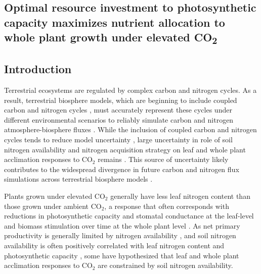 \begin{singlespace}
    \chapter{\textbf{Optimal resource investment to photosynthetic capacity maximizes nutrient allocation to whole plant growth under elevated CO\textsubscript{2}}}
\end{singlespace}
    
\section{Introduction}
\noindent Terrestrial ecosystems are regulated by complex carbon and nitrogen cycles. As a result, terrestrial biosphere models, which are beginning to include coupled carbon and nitrogen cycles , must accurately represent these cycles under different environmental scenarios to reliably simulate carbon and nitrogen atmosphere-biosphere fluxes . While the inclusion of coupled carbon and nitrogen cycles tends to reduce model uncertainty , large uncertainty in role of soil nitrogen availability and nitrogen acquisition strategy on leaf and whole plant acclimation responses to CO$_2$ remains . This source of uncertainty likely contributes to the widespread divergence in future carbon and nitrogen flux simulations across terrestrial biosphere models .

Plants grown under elevated CO$_2$ generally have less leaf nitrogen content than those grown under ambient CO$_2$, a response that often corresponds with reductions in photosynthetic capacity and stomatal conductance at the leaf-level and biomass stimulation over time at the whole plant level . As net primary productivity is generally limited by nitrogen availability , and soil nitrogen availability is often positively correlated with leaf nitrogen content and photosynthetic capacity , some have hypothesized that leaf and whole plant acclimation responses to CO$_2$ are constrained by soil nitrogen availability. 

